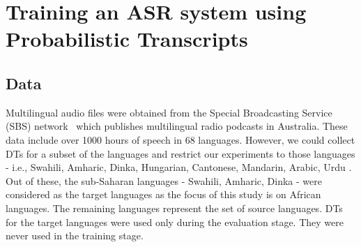 \documentclass[a4paper]{article}
\newcommand{\myvspacesec}{\vspace{-2mm}}
\begin{document}

\myvspacesec
\section{Training an ASR system using Probabilistic Transcripts}  \vspace{-2mm}
\label{sec:ASR Steps}
\subsection{Data} \vspace{-1mm}
Multilingual audio files were obtained from the Special Broadcasting Service (SBS) network~\cite{SBS} which publishes multilingual radio podcasts in Australia. These data include over 1000 hours of speech in 68 languages. However, we could collect DTs for a subset of the languages and restrict our experiments to those languages - i.e., Swahili, Amharic, Dinka, Hungarian, Cantonese, Mandarin, Arabic, Urdu . Out of these, the sub-Saharan languages - Swahili, Amharic, Dinka - were considered as the target languages as the focus of this study is on African languages. The remaining languages represent the set of source languages. DTs for the target languages were used only during the evaluation stage. They were never used in the training stage. 
\end{document}
